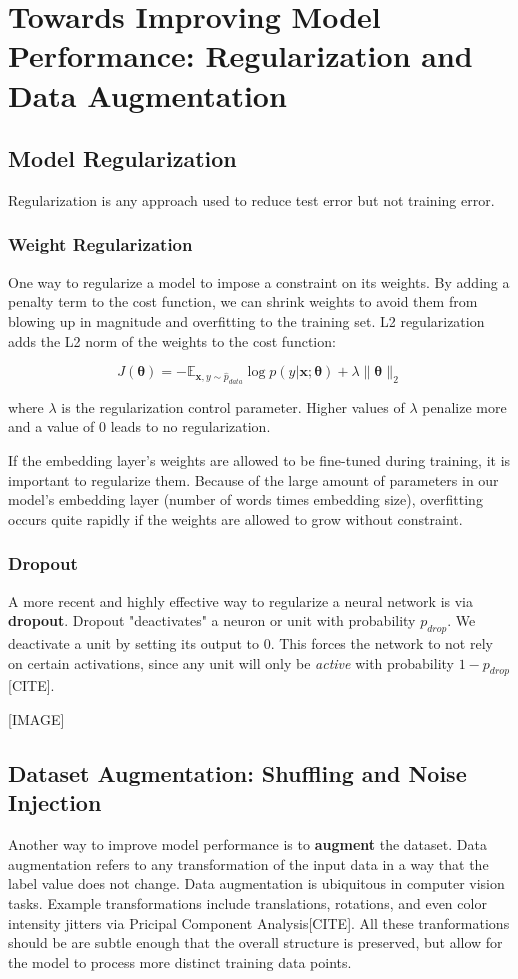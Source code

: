 
\chapter{Towards Improving Model Performance: Regularization and Data Augmentation}

\section{Model Regularization}
Regularization is any approach used to reduce test error but not training error.

\subsection{Weight Regularization}
One way to regularize a model to impose a constraint on its weights. By adding a penalty term to the cost function, we can shrink weights to avoid
them from blowing up in magnitude and overfitting to the training set. L2 regularization
adds the L2 norm of the weights to the cost function:

\[J(\bm{\theta}) = -\mathbb{E}_{\bm{x},y \sim \hat p_{data}} \log \textit{p}(y|\bm{x};\bm{\theta}) + \lambda \lVert \bm{\theta} \rVert_{2}\]

where $\lambda$ is the regularization control parameter. Higher values of $\lambda$ penalize more and a value of 0 leads to no regularization.

If the embedding layer's weights are allowed to be fine-tuned during training, it is
important to regularize them. Because of the large amount of parameters in our model's embedding layer (number of words times embedding size),
overfitting occurs quite rapidly if the weights are allowed to grow without constraint.

\subsection{Dropout}
A more recent and highly effective way to regularize a neural network is via \textbf{dropout}.
Dropout "deactivates" a neuron or unit with probability $p_{drop}$. We deactivate a unit
by setting its output to 0. This forces the network to not rely on certain
activations, since any unit will only be \textit{active} with probability $1-p_{drop}$[CITE].

[IMAGE]
\section{Dataset Augmentation: Shuffling and Noise Injection}
Another way to improve model performance is to \textbf{augment} the dataset.
Data augmentation refers to any transformation of the input data in a way that
the label value does not change. Data augmentation is ubiquitous in computer vision tasks. Example transformations include translations, rotations, and even color intensity jitters via Pricipal Component
Analysis[CITE]. All these tranformations should be are subtle enough that the overall structure is preserved, but
allow for the model to process more distinct training data points.

